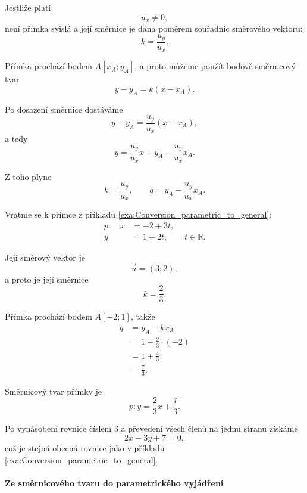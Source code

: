 Jestliže platí
\[
    u_x\neq0,
\]
není přímka svislá a její směrnice je dána poměrem souřadnic směrového
vektoru:
\[
    k=\frac{u_y}{u_x}.
\]

Přímka prochází bodem $A[x_A;y_A]$, a proto můžeme použít
bodově-směrnicový tvar
\[
    y-y_A=k(x-x_A).
\]

Po dosazení směrnice dostáváme
\[
    y-y_A
    =
    \frac{u_y}{u_x}(x-x_A),
\]
a tedy
\begin{equation}\label{eq:Conversion_parametric_to_slope}
    y
    =
    \frac{u_y}{u_x}x
    +
    y_A
    -
    \frac{u_y}{u_x}x_A.
\end{equation}

Z toho plyne
\[
    k=\frac{u_y}{u_x},
    \qquad
    q=y_A-\frac{u_y}{u_x}x_A.
\]

\begin{example}\label{exa:Conversion_parametric_to_slope}
    Vraťme se k přímce z příkladu
    \ref{exa:Conversion_parametric_to_general}:
    \[
        \begin{aligned}
            p:\quad x&=-2+3t,\\
                     y&=1+2t,
                     \qquad t\in\mathbb{R}.
        \end{aligned}
    \]

    Její směrový vektor je
    \[
        \vec{u}=(3;2),
    \]
    a proto je její směrnice
    \[
        k=\frac{2}{3}.
    \]

    Přímka prochází bodem $A[-2;1]$, takže
    \begin{align*}
        q
        &=
        y_A-kx_A\\
        &=
        1-\frac{2}{3}\cdot(-2)\\
        &=
        1+\frac{4}{3}\\
        &=
        \frac{7}{3}.
    \end{align*}

    Směrnicový tvar přímky je
    \[
        p:y=\frac{2}{3}x+\frac{7}{3}.
    \]

    Po vynásobení rovnice číslem $3$ a převedení všech členů na jednu
    stranu získáme
    \[
        2x-3y+7=0,
    \]
    což je stejná obecná rovnice jako v příkladu
    \ref{exa:Conversion_parametric_to_general}.
\end{example}


\paragraph{Ze směrnicového tvaru do parametrického vyjádření}

